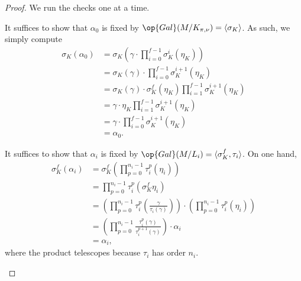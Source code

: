 \begin{proof}
	We run the checks one at a time.
	\begin{listalph}
		\item It suffices to show that $\alpha_0$ is fixed by $\op{Gal}(M/K_{\pi,\nu})=\langle\sigma_K\rangle$. As such, we simply compute
		\begin{align*}
			\sigma_K(\alpha_0) &= \sigma_K\left(\gamma\cdot\prod_{i=0}^{f-1}\sigma_K^i\left(\eta_K\right)\right) \\
			&= \sigma_K(\gamma)\cdot\prod_{i=0}^{f-1}\sigma_K^{i+1}\left(\eta_K\right) \\
			&= \sigma_K(\gamma)\cdot\sigma_K^f\left(\eta_K\right)\prod_{i=1}^{f-1}\sigma_K^{i+1}\left(\eta_K\right) \\
			&= \gamma\cdot \eta_K\prod_{i=1}^{f-1}\sigma_K^{i+1}\left(\eta_K\right) \\
			&= \gamma\cdot\prod_{i=0}^{f-1}\sigma_K^{i+1}\left(\eta_K\right) \\
			&= \alpha_0.
		\end{align*}
		\item It suffices to show that $\alpha_i$ is fixed by $\op{Gal}(M/L_i)=\langle\sigma_K^f,\tau_i\rangle$. On one hand,
		\begin{align*}
			\sigma_K^f(\alpha_i) &= \sigma_K^f\left(\prod_{p=0}^{n_i-1}\tau_i^p\left(\eta_i\right)\right) \\
			&= \prod_{p=0}^{n_i-1}\tau_i^p\left(\sigma_K^f\eta_i\right) \\
			&= \left(\prod_{p=0}^{n_i-1}\tau_i^p\left(\frac{\gamma}{\tau_i(\gamma)}\right)\right)\cdot\left(\prod_{p=0}^{n_i-1}\tau_i^p\left(\eta_i\right)\right) \\
			&= \left(\prod_{p=0}^{n_i-1}\frac{\tau_i^p(\gamma)}{\tau_i^{p+1}(\gamma)}\right)\cdot\alpha_i \\
			&= \alpha_i,
		\end{align*}
		where the product telescopes because $\tau_i$ has order $n_i$.


\end{listalph}
\end{proof}
